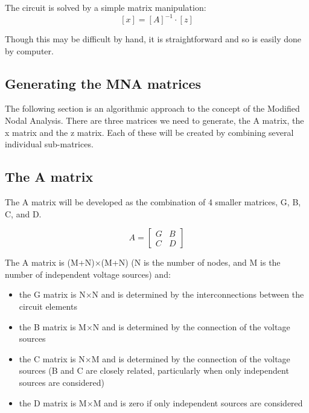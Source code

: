 \documentclass[10pt]{report}
\begin{document}
The circuit is solved by a simple matrix manipulation:
\begin{equation}
\left[x\right] = \left[A\right]^{-1} \cdot \left[z\right]
\end{equation}

Though this may be difficult by hand, it is straightforward and so is
easily done by computer.

\subsection{Generating the MNA matrices}

The following section is an algorithmic approach to the concept of the
Modified Nodal Analysis.  There are three matrices we need to
generate, the A matrix, the x matrix and the z matrix.  Each of these
will be created by combining several individual sub-matrices.

\subsection{The A matrix}

The A matrix will be developed as the combination of 4 smaller
matrices, G, B, C, and D.

\begin{equation}
A =
\begin{bmatrix}
G & B\\
C & D
\end{bmatrix}
\end{equation}

The A matrix is (M+N)$\times$(M+N) (N is the number of nodes, and M is the
number of independent voltage sources) and:

\begin{itemize}
\item
the G matrix is N$\times$N and is determined by the interconnections
between the circuit elements
\item
the B matrix is M$\times$N and is determined by the connection of the voltage
sources
\item
the C matrix is N$\times$M and is determined by the connection of
the voltage sources (B and C are closely related, particularly when
only independent sources are considered)
\item
the D matrix is M$\times$M and is zero if only independent sources are
considered
\end{itemize}
\end{document}
